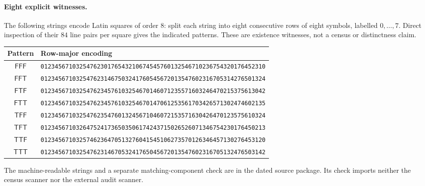 \paragraph{Eight explicit witnesses.}
The following strings encode Latin squares of order $8$: split each string
into eight consecutive rows of eight symbols, labelled $0,\ldots,7$.
Direct inspection of their $84$ line pairs per square gives the indicated
patterns. These are existence witnesses, not a census or distinctness claim.
\begin{center}
\small
\begin{tabular}{cl}
\toprule
Pattern & Row-major encoding\\
\midrule
$\mathsf{FFF}$ & \texttt{0123456710325476230176543210674545760132546710236754320176452310}\\
$\mathsf{FFT}$ & \texttt{0123456710325476231467503241760545672013547602316705314276501324}\\
$\mathsf{FTF}$ & \texttt{0123456710325476234576103254670146071235571603246470215375613042}\\
$\mathsf{FTT}$ & \texttt{0123456710325476234576103254670147061253561703426571302474602135}\\
$\mathsf{TFF}$ & \texttt{0123456710325476235476013245671046072153571630426470123575610324}\\
$\mathsf{TFT}$ & \texttt{0123456710326475241736503506174243715026526071346754230176450213}\\
$\mathsf{TTF}$ & \texttt{0123456710325746236470513276041545106273570126346457130276453120}\\
$\mathsf{TTT}$ & \texttt{0123456710325476231467053241765045672013547602316705132476503142}\\
\bottomrule
\end{tabular}
\end{center}
The machine-readable strings and a separate matching-component check are
in the dated source package. Its check imports neither the census scanner
nor the external audit scanner.
